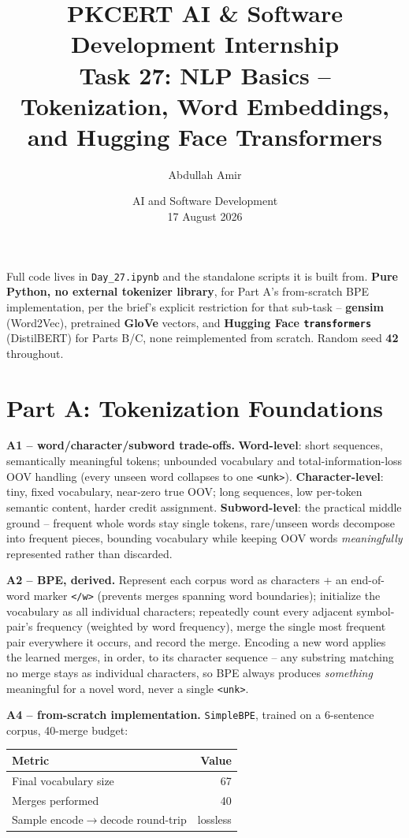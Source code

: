 \documentclass[11pt,a4paper]{article}
\title{\vspace{-1.5cm}\textbf{PKCERT AI \& Software Development Internship \\ Task 27: NLP Basics -- Tokenization, Word Embeddings, and Hugging Face Transformers}}
\author{Abdullah Amir}
\date{AI and Software Development \\ 17 August 2026}
\begin{document}
\maketitle
\vspace{-0.8cm}

Full code lives in \texttt{Day\_27.ipynb} and the standalone scripts it is built from.
\textbf{Pure Python, no external tokenizer library}, for Part A's from-scratch BPE
implementation, per the brief's explicit restriction for that sub-task -- \textbf{gensim}
(Word2Vec), pretrained \textbf{GloVe} vectors, and \textbf{Hugging Face
\texttt{transformers}} (DistilBERT) for Parts B/C, none reimplemented from scratch. Random
seed \textbf{42} throughout.

\section*{Part A: Tokenization Foundations}

\textbf{A1 -- word/character/subword trade-offs.} \textbf{Word-level}: short sequences,
semantically meaningful tokens; unbounded vocabulary and total-information-loss OOV handling
(every unseen word collapses to one \texttt{<unk>}). \textbf{Character-level}: tiny, fixed
vocabulary, near-zero true OOV; long sequences, low per-token semantic content, harder
credit assignment. \textbf{Subword-level}: the practical middle ground -- frequent whole
words stay single tokens, rare/unseen words decompose into frequent pieces, bounding
vocabulary while keeping OOV words \emph{meaningfully} represented rather than discarded.

\textbf{A2 -- BPE, derived.} Represent each corpus word as characters + an end-of-word marker
\texttt{</w>} (prevents merges spanning word boundaries); initialize the vocabulary as all
individual characters; repeatedly count every adjacent symbol-pair's frequency (weighted by
word frequency), merge the single most frequent pair everywhere it occurs, and record the
merge. Encoding a new word applies the learned merges, in order, to its character sequence --
any substring matching no merge stays as individual characters, so BPE always produces
\emph{something} meaningful for a novel word, never a single \texttt{<unk>}.

\textbf{A4 -- from-scratch implementation.} \texttt{SimpleBPE}, trained on a 6-sentence
corpus, 40-merge budget:

\begin{table}[H]
\centering
\begin{tabular}{lr}
\toprule
\textbf{Metric} & \textbf{Value} \\
\midrule
Final vocabulary size & 67 \\
Merges performed & 40 \\
Sample encode$\to$decode round-trip & lossless \\
\bottomrule
\end{tabular}
\end{table}
\end{document}
